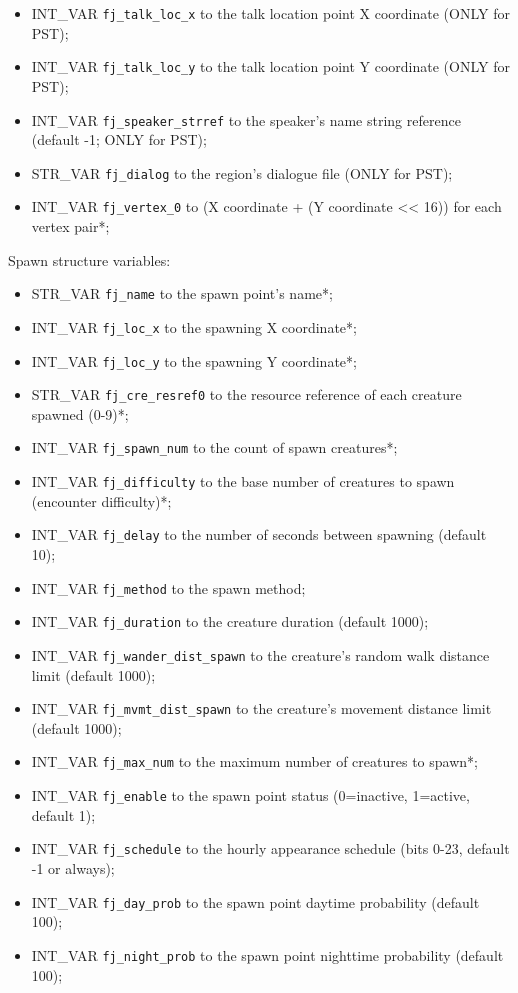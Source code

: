 \documentclass{article}
\begin{document}
\begin{itemize}
\item INT_VAR \verb+fj_talk_loc_x+ to the talk location point X coordinate (ONLY for PST);
\item INT_VAR \verb+fj_talk_loc_y+ to the talk location point Y coordinate (ONLY for PST);
\item INT_VAR \verb+fj_speaker_strref+ to the speaker's name string reference (default -1; ONLY for PST);
\item STR_VAR \verb+fj_dialog+ to the region's dialogue file (ONLY for PST);
\item INT_VAR \verb+fj_vertex_0+ to (X coordinate + (Y coordinate << 16)) for each vertex pair*;
\end{itemize}
Spawn structure variables:
\begin{itemize}
\item STR_VAR \verb+fj_name+ to the spawn point's name*;
\item INT_VAR \verb+fj_loc_x+ to the spawning X coordinate*;
\item INT_VAR \verb+fj_loc_y+ to the spawning Y coordinate*;
\item STR_VAR \verb+fj_cre_resref0+ to the resource reference of each creature spawned (0-9)*;
\item INT_VAR \verb+fj_spawn_num+ to the count of spawn creatures*;
\item INT_VAR \verb+fj_difficulty+ to the base number of creatures to spawn (encounter difficulty)*;
\item INT_VAR \verb+fj_delay+ to the number of seconds between spawning (default 10);
\item INT_VAR \verb+fj_method+ to the spawn method;
\item INT_VAR \verb+fj_duration+ to the creature duration (default 1000);
\item INT_VAR \verb+fj_wander_dist_spawn+ to the creature's random walk distance limit (default 1000);
\item INT_VAR \verb+fj_mvmt_dist_spawn+ to the creature's movement distance limit (default 1000);
\item INT_VAR \verb+fj_max_num+ to the maximum number of creatures to spawn*;
\item INT_VAR \verb+fj_enable+ to the spawn point status (0=inactive, 1=active, default 1);
\item INT_VAR \verb+fj_schedule+ to the hourly appearance schedule (bits 0-23, default -1 or always);
\item INT_VAR \verb+fj_day_prob+ to the spawn point daytime probability (default 100);
\item INT_VAR \verb+fj_night_prob+ to the spawn point nighttime probability (default 100);
\end{itemize}
\end{document}
